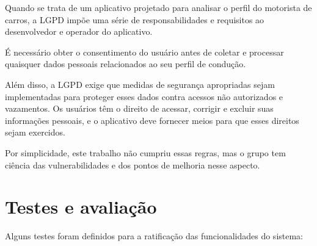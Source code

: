     Quando se trata de um aplicativo projetado para analisar o perfil do motorista de carros, a LGPD impõe uma série de responsabilidades e requisitos ao desenvolvedor e operador do aplicativo. 
    
    É necessário obter o consentimento  do usuário antes de coletar e processar quaisquer dados pessoais relacionados ao seu perfil de condução.
    
    Além disso, a LGPD exige que medidas de segurança apropriadas sejam implementadas para proteger esses dados contra acessos não autorizados e vazamentos. Os usuários têm o direito de acessar, corrigir e excluir suas informações pessoais, e o aplicativo deve fornecer meios para que esses direitos sejam exercidos.

    Por simplicidade, este trabalho não cumpriu essas regras, mas o grupo tem ciência das vulnerabilidades e dos pontos de melhoria nesse aspecto.






\section{Testes e avaliação}
Alguns testes foram definidos para a ratificação das funcionalidades do sistema:


